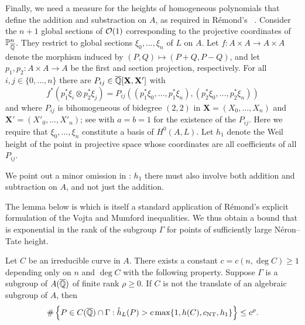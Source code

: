 Finally, we need a measure for the heights of homogeneous polynomials that
define the addition and substraction on $A$, as required in R\'emond's
~\cite{remond:vojtasup}. Consider the $n+1$ global sections of ${\mathcal O}(1)$
corresponding to the projective coordinates of $\mathbb{P}_{\overline{\mathbb{Q}}}^n$.
They restrict to  global sections $\xi_0,\ldots,\xi_n$ of
$L$ on $A$. Let $f\colon A\times A\rightarrow A\times A$ denote the
morphism induced by $(P,Q)\mapsto (P+Q,P-Q)$, and let $p_1,p_2\colon
A\times A\rightarrow A$ be the first and section projection,
respectively. For all $i,j\in \{0,\ldots,n\}$ there are $P_{ij} \in
{\overline{\mathbb{Q}}}[\mathbf{X},\mathbf{X}']$ with 
\begin{equation}
  \label{eq:Pijforh1}
  f^*(p_1^*\xi_i\otimes
  p_2^*\xi_j)=P_{ij}((p_1^*\xi_0,\ldots,p_1^*\xi_n),(p_2^*\xi_0,\ldots,p_2^*\xi_n))
\end{equation}
and where $P_{ij}$ is bihomogeneous of bidegree $(2,2)$ in $\mathbf{X}
= (X_0,\ldots,X_n)$ and $\mathbf{X}' = (X'_0,\ldots,X'_n)$; see 
 \cite[Proposition~5.2]{remond:vojtasup} with $a=b=1$
for the existence of the $P_{ij}$. Here we require that
$\xi_0,\ldots,\xi_n$ constitute a basis of $H^0(A,L)$. Let $h_1$
denote the Weil height of the point in projective space whose
coordinates are all coefficients of all $P_{ij}$.

We point out a minor omission in \cite[$\mathsection$2]{DGH1p}: $h_1$
there must also involve both addition and subtraction on $A$, and not just
the addition.

The lemma below is \cite[Corollary~2.3]{DGH1p} which is itself a
standard application of R\'emond's explicit formulation of the Vojta
and Mumford inequalities. We thus obtain a bound that is exponential in the
rank of the subgroup $\Gamma$ for points of sufficiently large
N\'eron--Tate height. 

\begin{lemma}
  \label{lem:vojtamumford}
  Let $C$ be an irreducible curve in $A$.
There exists a constant $c=c(n,\deg C)\ge 1$ depending
only on $n$ and $\deg C$ with the following property. Suppose $\Gamma$
is a subgroup of $A({\overline{\mathbb{Q}}})$ of finite rank $\rho\ge 0$. If $C$ is not
the translate of an algebraic subgroup of $A$, then
\begin{equation*}
\# \left \{P \in C({\overline{\mathbb{Q}}})\cap \Gamma : \hat h_{L}(P) >
c\max\{1,h(C),c_{\mathrm{NT}},h_1\} \right\} \le c^\rho.
\end{equation*}
\end{lemma}

